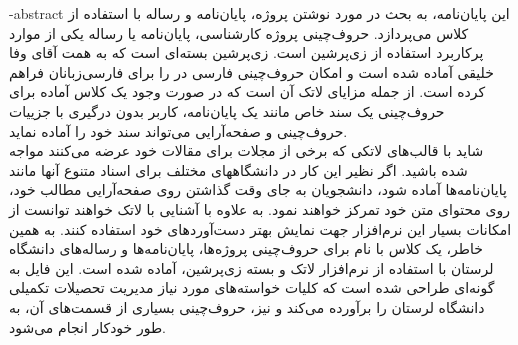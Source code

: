 \fa-abstract{
این پایان‌نامه، به بحث در مورد نوشتن پروژه، پایان‌نامه و رساله با استفاده از کلاس 
می‌پردازد.
حروف‌چینی پروژه کارشناسی، پایان‌نامه یا رساله یکی از موارد پرکاربرد استفاده از زی‌پرشین است. 
زی‌پرشین بسته‌ای است که به همت آقای وفا خلیقی آماده شده است و امکان حروف‌چینی فارسی در \lr{\LaTeXe}{} را  برای فارسی‌زبانان فراهم کرده است.
از جمله مزایای لاتک آن است که در صورت وجود یک کلاس آماده برای حروف‌چینی یک سند خاص مانند یک پایان‌نامه، کاربر بدون درگیری با جزییات حروف‌چینی و صفحه‌آرایی می‌تواند سند خود را آماده نماید.
\\
شاید با قالب‌های لاتکی که برخی از مجلات برای مقالات خود عرضه می‌کنند مواجه شده باشید. اگر نظیر این کار در دانشگاههای مختلف برای اسناد متنوع آنها مانند پایا‌ن‌نامه‌ها آماده شود، دانشجویان به جای وقت گذاشتن روی صفحه‌آرایی مطالب خود، روی محتوای متن خود تمرکز خواهند نمود. به علاوه با آشنایی با لاتک خواهند توانست از امکانات بسیار این نرم‌افزار جهت نمایش بهتر دست‌آوردهای خود استفاده کنند.
به همین خاطر، یک کلاس با نام 
 برای حروف‌چینی پروژه‌ها، پایان‌نامه‌ها و رساله‌های دانشگاه لرستان با استفاده از نرم‌افزار لاتک و بسته زی‌پرشین،  آماده شده است. این فایل به 
گونه‌ای طراحی شده است که کلیات خواسته‌های مورد نیاز  مدیریت تحصیلات تکمیلی دانشگاه لرستان را برآورده می‌کند و نیز، حروف‌چینی بسیاری از قسمت‌های آن، به طور خودکار انجام می‌شود.
}

\abstractPage

\prefacePage

\newpage\clearpage